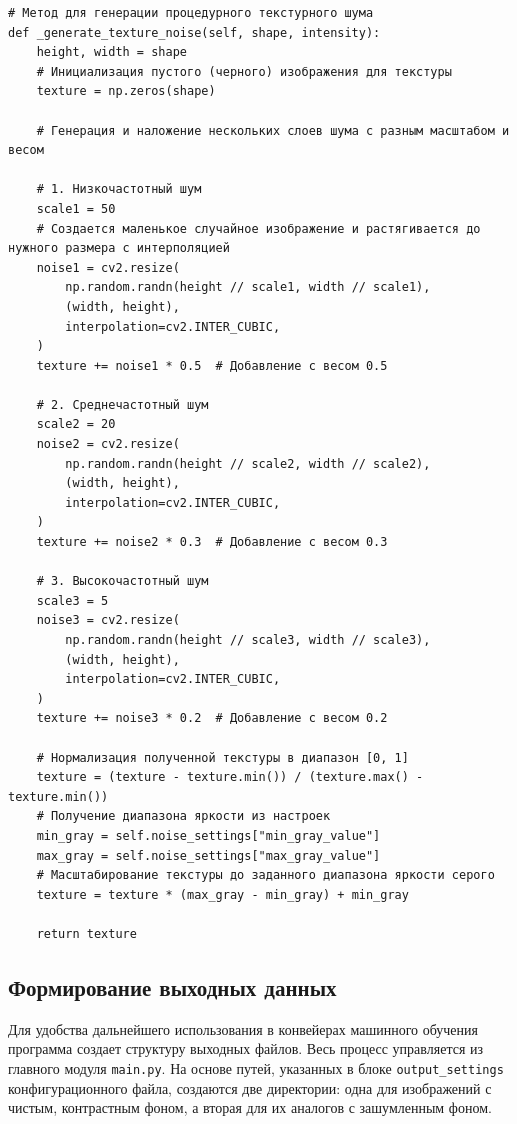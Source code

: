 \documentclass[code]{wordcore}
\begin{document}
\begin{code}
	\begin{verbatim}
# Метод для генерации процедурного текстурного шума
def _generate_texture_noise(self, shape, intensity):
    height, width = shape
    # Инициализация пустого (черного) изображения для текстуры
    texture = np.zeros(shape)

    # Генерация и наложение нескольких слоев шума с разным масштабом и весом
    
    # 1. Низкочастотный шум
    scale1 = 50
    # Создается маленькое случайное изображение и растягивается до нужного размера с интерполяцией
    noise1 = cv2.resize(
        np.random.randn(height // scale1, width // scale1),
        (width, height),
        interpolation=cv2.INTER_CUBIC,
    )
    texture += noise1 * 0.5  # Добавление с весом 0.5

    # 2. Среднечастотный шум
    scale2 = 20
    noise2 = cv2.resize(
        np.random.randn(height // scale2, width // scale2),
        (width, height),
        interpolation=cv2.INTER_CUBIC,
    )
    texture += noise2 * 0.3  # Добавление с весом 0.3

    # 3. Высокочастотный шум
    scale3 = 5
    noise3 = cv2.resize(
        np.random.randn(height // scale3, width // scale3),
        (width, height),
        interpolation=cv2.INTER_CUBIC,
    )
    texture += noise3 * 0.2  # Добавление с весом 0.2

    # Нормализация полученной текстуры в диапазон [0, 1]
    texture = (texture - texture.min()) / (texture.max() - texture.min())
    # Получение диапазона яркости из настроек
    min_gray = self.noise_settings["min_gray_value"]
    max_gray = self.noise_settings["max_gray_value"]
    # Масштабирование текстуры до заданного диапазона яркости серого
    texture = texture * (max_gray - min_gray) + min_gray

    return texture
  \end{verbatim}
\end{code}

\subsection{Формирование выходных данных}

Для удобства дальнейшего использования в конвейерах машинного обучения программа создает структуру выходных файлов. Весь процесс управляется из главного модуля \texttt{main.py}. На основе путей, указанных в блоке \texttt{output\_settings} конфигурационного файла, создаются две директории: одна для изображений с чистым, контрастным фоном, а вторая для их аналогов с зашумленным фоном.
\end{document}
